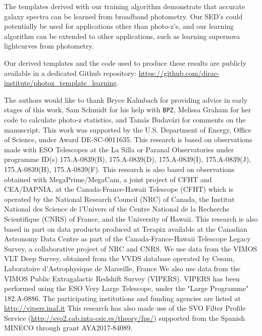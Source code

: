 \documentclass[twocolumn]{aastex63}
\newcommand{\pzcode}[1]{\texttt{#1}}
\newcommand{\bpz}{\pzcode{BPZ}}
\begin{document}
    The templates derived with our training algorithm demonstrate that accurate galaxy spectra can be learned from broadband photometry.
    Our SED's could potentially be used for applications other than photo-z's, and our learning algorithm can be extended to other applications, such as learning supernova lightcurves from photometry.

    Our derived templates and the code used to produce these results are publicly available in a dedicated Github repository: \url{https://github.com/dirac-institute/photoz_template_learning}.

\acknowledgments

The authors would like to thank Bryce Kalmbach for providing advice in early stages of this work, Sam Schmidt for his help with \bpz, Melissa Graham for her code to calculate photo-z statistics, and Tam\'as Budav\'ari for comments on the manuscript. This work was supported by the U.S. Department of Energy, Office of Science, under Award DE-SC-0011635.
\newline
This research is based on observations made with ESO Telescopes at the La Silla or Paranal Observatories under programme ID(s) 175.A-0839(B), 175.A-0839(D), 175.A-0839(I), 175.A-0839(J), 175.A-0839(H), 175.A-0839(F).
This research is also based on observations obtained with MegaPrime/MegaCam, a joint project of CFHT and CEA/DAPNIA, at the Canada-France-Hawaii Telescope (CFHT) which is operated by the National Research Council (NRC) of Canada, the Institut National des Science de l'Univers of the Centre National de la Recherche Scientifique (CNRS) of France, and the University of Hawaii.
This research is also based in part on data products produced at Terapix available at the Canadian Astronomy Data Centre as part of the Canada-France-Hawaii Telescope Legacy Survey, a collaborative project of NRC and CNRS.
We use data from the VIMOS VLT Deep Survey, obtained from the VVDS database operated by Cesam, Laboratoire d'Astrophysique de Marseille, France
We also use data from the VIMOS Public Extragalactic Redshift Survey (VIPERS).
VIPERS has been performed using the ESO Very Large Telescope, under the "Large Programme" 182.A-0886. 
The participating institutions and funding agencies are listed at \url{http://vipers.inaf.it}
This research has also made use of the SVO Filter Profile Service (\url{http://svo2.cab.inta-csic.es/theory/fps/}) supported from the Spanish MINECO through grant AYA2017-84089.

    

{}

\end{document}
